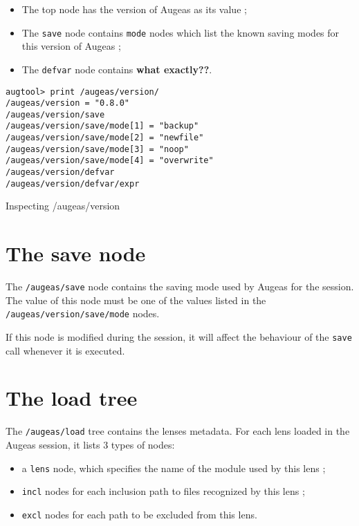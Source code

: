 \begin{itemize}
\item
  The top node has the version of Augeas as its value ;
\item
  The \verb!save! node contains \verb!mode! nodes which list the known saving modes for this version of Augeas ;
\item
  The \verb!defvar! node contains \textbf{what exactly??}.
\end{itemize}


\begin{listing}
  \begin{verbatim}
augtool> print /augeas/version/
/augeas/version = "0.8.0"
/augeas/version/save
/augeas/version/save/mode[1] = "backup"
/augeas/version/save/mode[2] = "newfile"
/augeas/version/save/mode[3] = "noop"
/augeas/version/save/mode[4] = "overwrite"
/augeas/version/defvar
/augeas/version/defvar/expr
  \end{verbatim}
  \caption{Inspecting /augeas/version}
  \label{lst:metadata_version}
\end{listing}


\section{The save node}

\label{sec:save_node} 

The \nolinkurl{/augeas/save} node contains the saving mode used by Augeas for the session. The value of this node must be one of the values listed in the \nolinkurl{/augeas/version/save/mode} nodes.

If this node is modified during the session, it will affect the behaviour of the \verb!save! call whenever it is executed.

\section{The load tree}


The \nolinkurl{/augeas/load} tree contains the lenses metadata. For each lens loaded in the Augeas session, it lists 3 types of nodes:

\begin{itemize}
\item
  a \verb!lens! node, which specifies the name of the module used by this lens ;
\item
  \verb!incl! nodes for each inclusion path to files recognized by this lens ;
\item
  \verb!excl! nodes for each path to be excluded from this lens.
\end{itemize}

